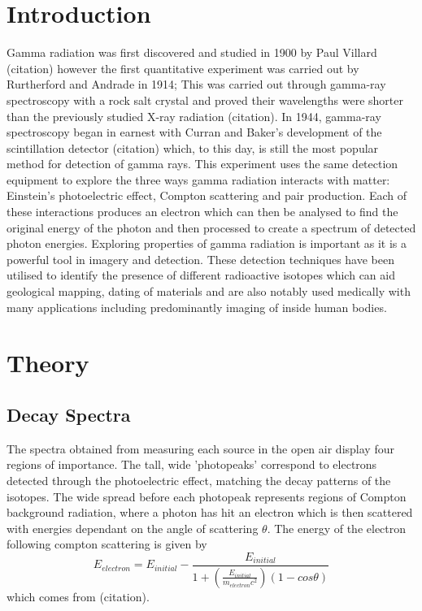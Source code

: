 \documentclass[11pt]{article} %
\begin{document}
\newpage %

\section{Introduction} 
\label{intro}
    Gamma radiation was first discovered and studied in 1900 by Paul Villard (citation) however the first quantitative experiment was carried out by Rurtherford and Andrade in 1914; This was carried out through gamma-ray spectroscopy with a rock salt crystal and proved their wavelengths were shorter than the previously studied X-ray radiation (citation). In 1944, gamma-ray spectroscopy began in earnest with Curran and Baker’s development of the scintillation detector (citation) which, to this day, is still the most popular method for detection of gamma rays. This experiment uses the same detection equipment to explore the three ways gamma radiation interacts with matter: Einstein’s photoelectric effect, Compton scattering and pair production. Each of these interactions produces an electron which can then be analysed to find the original energy of the photon and then processed to create a spectrum of detected photon energies. Exploring properties of gamma radiation is important as it is a powerful tool in imagery and detection. These detection techniques have been utilised to identify the presence of different radioactive isotopes which can aid geological mapping, dating of materials and are also notably used medically with many applications including predominantly imaging of inside human bodies.

\section{Theory}
    \subsection{Decay Spectra}
        The spectra obtained from measuring each source in the open air display four regions of importance. The tall, wide 'photopeaks' correspond to electrons detected through the photoelectric effect, matching the decay patterns of the isotopes. The wide spread before each photopeak represents regions of Compton background radiation, where a photon has hit an electron which is then scattered with energies dependant on the angle of scattering $\theta$. The energy of the electron following compton scattering is given by
        \begin{equation}\label{compton}
            E_{electron} = E_{initial}-\frac{E_{initial}}{1+(\frac{E_{initial}}{m_{electron}c^{2}})(1-cos\theta)}
        \end{equation}
        which comes from (citation).
\end{document}
